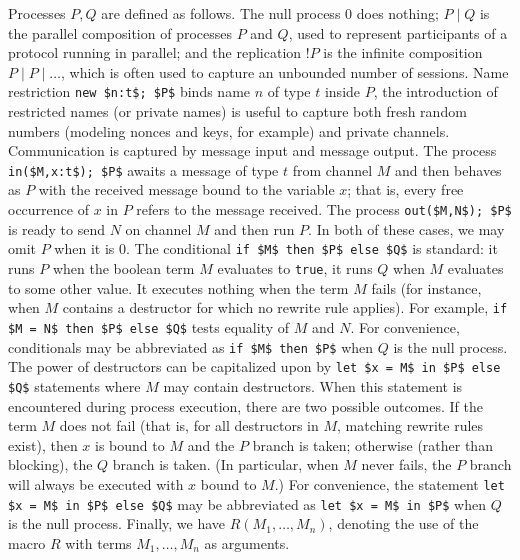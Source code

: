 \documentclass{book}
\newcommand{\nill}{0}
\begin{document}
Processes $P,Q$ are defined as follows. The null process $\nill$ does nothing;
$P \mid Q$ is the parallel composition of  processes $P$ and $Q$,
used to represent participants of a protocol running in parallel;
and the replication $!P$ is the infinite composition $P \mid P \mid \ldots$,
which is often used to capture an unbounded number of sessions.
Name restriction \lstinline!new $n:t$; $P$! binds name $n$ of type $t$ inside $P$, the introduction
of restricted names (or private names) is useful to capture both fresh random numbers
(modeling nonces and keys, for example) and private channels.
Communication is captured by message input and message output. The
process \lstinline!in($M,x:t$); $P$!
awaits a message of type $t$ from channel $M$ and then behaves as $P$ with the
received message bound to the variable $x$; that is, every free occurrence
of $x$ in $P$ refers to the message received.
The process \lstinline!out($M,N$); $P$! is ready
to send $N$ on channel $M$ and then run $P$. In both of these cases, we
may omit $P$ when it is $\nill$.
The conditional \lstinline!if $M$ then $P$ else $Q$! is standard:
it runs $P$ when the boolean term $M$ evaluates to \lstinline!true!,
it runs $Q$ when $M$ evaluates to some other value.
It executes nothing when the term $M$ fails (for instance,
when $M$ contains a destructor for which no rewrite rule applies).
For example, \lstinline!if $M = N$ then $P$ else $Q$!
 tests equality of $M$ and $N$.
For convenience, conditionals may be abbreviated as
\lstinline!if $M$ then $P$! when $Q$ is the null process.
%
The power of destructors can be capitalized upon by \lstinline!let $x = M$ in $P$ else $Q$! statements
where $M$ may contain destructors. %
When this statement is encountered during process execution, there are two possible outcomes.
If the term $M$ does not fail (that is, for all destructors in $M$, matching rewrite rules exist), then
$x$ is bound to $M$ and the $P$ branch is taken; otherwise (rather than blocking), the $Q$ branch is taken.
(In particular, when $M$ never fails, the $P$ branch will always be executed with $x$ bound to $M$.)
For convenience, the statement \lstinline!let $x = M$ in $P$ else $Q$! may be abbreviated as \lstinline!let $x = M$ in $P$! when $Q$ is the null process.
%
Finally, we have $R(M_1,\ldots,M_n)$, denoting the use of the macro
$R$ with terms $M_1,\ldots,M_n$ as arguments.
\end{document}
